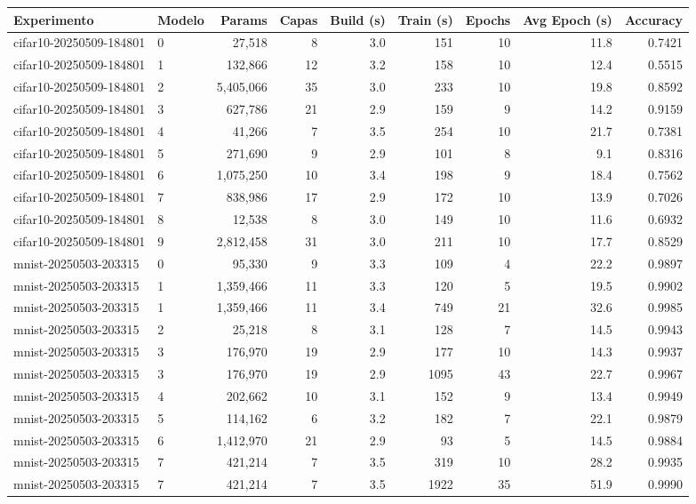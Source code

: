 \begin{tabular}{llrrrrrrr}
\toprule
Experimento & Modelo & Params & Capas & Build (s) & Train (s) & Epochs & Avg Epoch (s) & Accuracy \\
\midrule
cifar10-20250509-184801 & 0 & 27,518 & 8 & 3.0 & 151 & 10 & 11.8 & 0.7421 \\
cifar10-20250509-184801 & 1 & 132,866 & 12 & 3.2 & 158 & 10 & 12.4 & 0.5515 \\
cifar10-20250509-184801 & 2 & 5,405,066 & 35 & 3.0 & 233 & 10 & 19.8 & 0.8592 \\
cifar10-20250509-184801 & 3 & 627,786 & 21 & 2.9 & 159 & 9 & 14.2 & 0.9159 \\
cifar10-20250509-184801 & 4 & 41,266 & 7 & 3.5 & 254 & 10 & 21.7 & 0.7381 \\
cifar10-20250509-184801 & 5 & 271,690 & 9 & 2.9 & 101 & 8 & 9.1 & 0.8316 \\
cifar10-20250509-184801 & 6 & 1,075,250 & 10 & 3.4 & 198 & 9 & 18.4 & 0.7562 \\
cifar10-20250509-184801 & 7 & 838,986 & 17 & 2.9 & 172 & 10 & 13.9 & 0.7026 \\
cifar10-20250509-184801 & 8 & 12,538 & 8 & 3.0 & 149 & 10 & 11.6 & 0.6932 \\
cifar10-20250509-184801 & 9 & 2,812,458 & 31 & 3.0 & 211 & 10 & 17.7 & 0.8529 \\
mnist-20250503-203315 & 0 & 95,330 & 9 & 3.3 & 109 & 4 & 22.2 & 0.9897 \\
mnist-20250503-203315 & 1 & 1,359,466 & 11 & 3.3 & 120 & 5 & 19.5 & 0.9902 \\
mnist-20250503-203315 & 1 & 1,359,466 & 11 & 3.4 & 749 & 21 & 32.6 & 0.9985 \\
mnist-20250503-203315 & 2 & 25,218 & 8 & 3.1 & 128 & 7 & 14.5 & 0.9943 \\
mnist-20250503-203315 & 3 & 176,970 & 19 & 2.9 & 177 & 10 & 14.3 & 0.9937 \\
mnist-20250503-203315 & 3 & 176,970 & 19 & 2.9 & 1095 & 43 & 22.7 & 0.9967 \\
mnist-20250503-203315 & 4 & 202,662 & 10 & 3.1 & 152 & 9 & 13.4 & 0.9949 \\
mnist-20250503-203315 & 5 & 114,162 & 6 & 3.2 & 182 & 7 & 22.1 & 0.9879 \\
mnist-20250503-203315 & 6 & 1,412,970 & 21 & 2.9 & 93 & 5 & 14.5 & 0.9884 \\
mnist-20250503-203315 & 7 & 421,214 & 7 & 3.5 & 319 & 10 & 28.2 & 0.9935 \\
mnist-20250503-203315 & 7 & 421,214 & 7 & 3.5 & 1922 & 35 & 51.9 & 0.9990 \\

\end{tabular}
